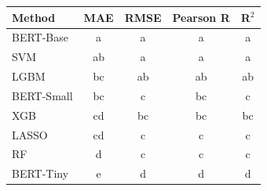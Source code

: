 \begin{tabular}{lcccc}
\toprule
Method & MAE & RMSE & Pearson R & R$^2$ \\
\midrule
BERT-Base & a & a & a & a \\
SVM & ab & a & a & a \\
LGBM & bc & ab & ab & ab \\
BERT-Small & bc & c & bc & c \\
XGB & cd & bc & bc & bc \\
LASSO & cd & c & c & c \\
RF & d & c & c & c \\
BERT-Tiny & e & d & d & d \\
\bottomrule
\end{tabular}
